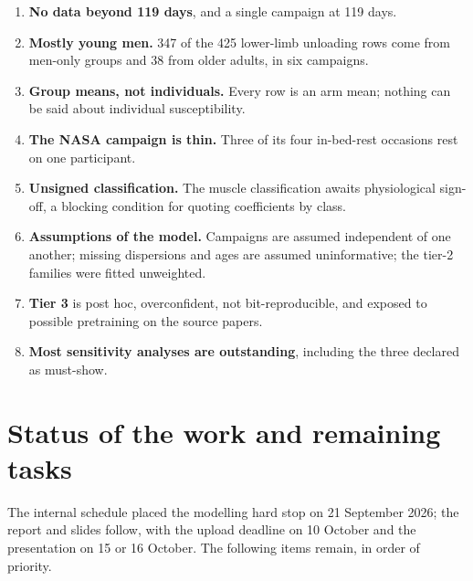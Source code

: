 \begin{enumerate}
        the 14 spaceflight rows are too few to test it and eight of them are lumbar multifidus.
  \item \textbf{No data beyond 119 days}, and a single campaign at 119 days.
  \item \textbf{Mostly young men.} 347 of the 425 lower-limb unloading rows come from men-only groups and 38 from
        older adults, in six campaigns.
  \item \textbf{Group means, not individuals.} Every row is an arm mean; nothing can be said about individual
        susceptibility.
  \item \textbf{The NASA campaign is thin.} Three of its four in-bed-rest occasions rest on one participant.
  \item \textbf{Unsigned classification.} The muscle classification awaits physiological sign-off, a blocking
        condition for quoting coefficients by class.
  \item \textbf{Assumptions of the model.} Campaigns are assumed independent of one another; missing dispersions and
        ages are assumed uninformative; the tier-2 families were fitted unweighted.
  \item \textbf{Tier 3} is post hoc, overconfident, not bit-reproducible, and exposed to possible pretraining on the
        source papers.
  \item \textbf{Most sensitivity analyses are outstanding}, including the three declared as must-show.
\end{enumerate}

\section{Status of the work and remaining tasks}
\label{sec:outstanding}

The internal schedule placed the modelling hard stop on 21 September 2026; the report and slides follow, with the
upload deadline on 10 October and the presentation on 15 or 16 October. The following items remain, in order of
priority.

